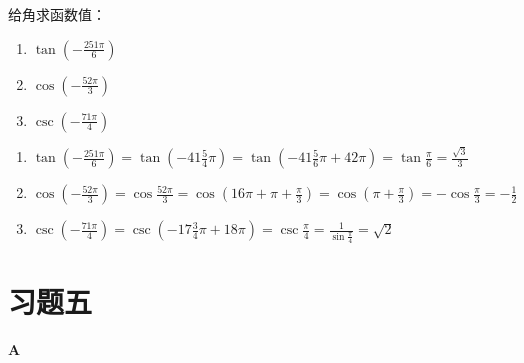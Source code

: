 \begin{example}
    给角求函数值：
\begin{multicols}{3}
\begin{enumerate}[(1)]
    \item $\tan\left(-\frac{251\pi}{6}\right)$
    \item $\cos\left(-\frac{52\pi}{3}\right)$
    \item $\csc\left(-\frac{71\pi}{4}\right)$
\end{enumerate}
\end{multicols}
\end{example}

\begin{solution}
\begin{enumerate}[(1)]
    \item $\tan\left(-\frac{251\pi}{6}\right)=\tan\left(-41\frac{5}{4}\pi\right)=\tan\left(-41\frac{5}{6}\pi+42\pi\right)=\tan\frac{\pi}{6}=\frac{\sqrt{3}}{3}$
    \item $\cos\left(-\frac{52\pi}{3}\right)=\cos\frac{52\pi}{3}=\cos\left(16\pi+\pi+\frac{\pi}{3}\right)=\cos\left(\pi+\frac{\pi}{3}\right)=-\cos\frac{\pi}{3}=-\frac{1}{2}$
    \item $\csc\left(-\frac{71\pi}{4}\right)=\csc\left(-17\frac{3}{4}\pi+18\pi\right)=\csc\frac{\pi}{4}=\frac{1}{\sin\frac{\pi}{4}}=\sqrt{2}$
\end{enumerate}
\end{solution}


\section*{习题五}
\begin{center}
    \bfseries A
\end{center}

